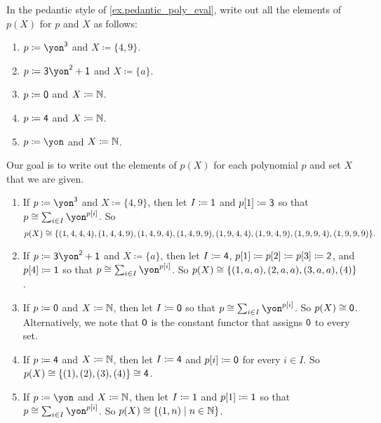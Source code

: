 \documentclass[Book-Poly]{subfiles}
\begin{document}
\begin{exercise}
In the pedantic style of \cref{ex.pedantic_poly_eval}, write out all the elements of $p(X)$ for $p$ and $X$ as follows:
\begin{enumerate}
	\item $p\coloneqq\yon^\3$ and $X\coloneqq\{4,9\}.$
	\item $p\coloneqq\3\yon^\2+\1$ and $X\coloneqq\{a\}$.
	\item $p\coloneqq\textsf{0}$ and $X\coloneqq\mathbb{N}$.
	\item $p\coloneqq\textsf{4}$ and $X\coloneqq\mathbb{N}$.
	\item $p\coloneqq\yon$ and $X\coloneqq\mathbb{N}$.
\qedhere
\end{enumerate}

\begin{solution}
Our goal is to write out the elements of $p(X)$ for each polynomial $p$ and set $X$ that we are given.
\begin{enumerate}
    \item If $p\coloneqq\yon^\3$ and $X\coloneqq\{4,9\}$, then let $I \coloneqq \textsf{1}$ and $p[1] \coloneqq \textsf{3}$ so that $p \iso \sum_{i \in I} \yon^{p[i]}$.
    So
    \[
        p(X) \cong \{(1, 4, 4, 4), (1, 4, 4, 9), (1, 4, 9, 4), (1, 4, 9, 9), (1, 9, 4, 4), (1, 9, 4, 9), (1, 9, 9, 4), (1, 9, 9, 9)\}.
    \]
    
    \item If $p\coloneqq\3\yon^\2+\1$ and $X\coloneqq\{a\}$, then let $I \coloneqq \textsf{4}$, $p[1] \coloneqq p[2] \coloneqq p[3] \coloneqq \textsf{2}$, and $p[4] \coloneqq \textsf{1}$ so that $p \iso \sum_{i \in I} \yon^{p[i]}$.
    So $p(X) \cong \{(1, a, a), (2, a, a), (3, a, a), (4)\}$.
	
	\item If $p\coloneqq\textsf{0}$ and $X\coloneqq\mathbb{N}$, then let $I \coloneqq \textsf{0}$ so that $p \iso \sum_{i \in I} \yon^{p[i]}$.
	So $p(X) \cong \textsf{0}$.
	Alternatively, we note that $\textsf{0}$ is the constant functor that assigns $\textsf{0}$ to every set. 
	
	\item If $p\coloneqq\textsf{4}$ and $X\coloneqq\mathbb{N}$, then let $I \coloneqq \textsf{4}$ and $p[i] \coloneqq \textsf{0}$ for every $i \in I$.
	So $p(X) \cong \{(1), (2), (3), (4)\} \cong \textsf{4}$.
	
	\item If $p\coloneqq\yon$ and $X\coloneqq\mathbb{N}$, then let $I \coloneqq \textsf{1}$ and $p[1] \coloneqq \textsf{1}$ so that $p \iso \sum_{i \in I} \yon^{p[i]}$.
    So $p(X) \cong \{(1, n) \mid n \in \mathbb{N}\}$.
\end{enumerate}
\end{solution}
\end{exercise}
\end{document}
